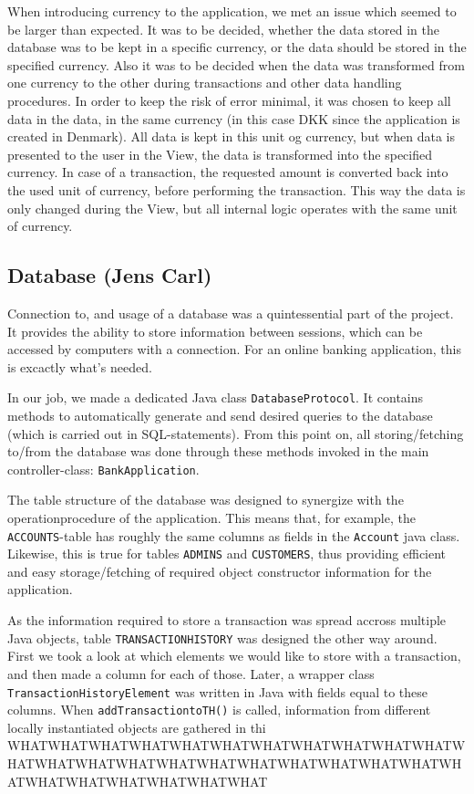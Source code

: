 When introducing currency to the application, we met an issue which seemed to be larger than expected. It was to be decided, whether the data stored in the database was to be kept in a specific currency, or the data should be stored in the specified currency. Also it was to be decided when the data was transformed from one currency to the other during transactions and other data handling procedures. In order to keep the risk of error minimal, it was chosen to keep all data in the data, in the same currency (in this case DKK since the application is created in Denmark). All data is kept in this unit og currency, but when data is presented to the user in the View, the data is transformed into the specified currency. In case of a transaction, the requested amount is converted back into the used unit of currency, before performing the transaction. This way the data is only changed during the View, but all internal logic operates with the same unit of currency.

\subsection{Database (Jens Carl)}
Connection to, and usage of a database was a quintessential part of the project. It provides the ability to store information between sessions, which can be accessed by computers with a connection. For an online banking application, this is excactly what's needed.

In our job, we made a dedicated Java class \texttt{DatabaseProtocol}. It contains methods to automatically generate and send desired queries to the database (which is carried out in SQL-statements). From this point on, all storing/fetching to/from the database was done through these methods invoked in the main controller-class: \texttt{BankApplication}. 

The table structure of the database was designed to synergize with the operationprocedure of the application. This means that, for example, the \texttt{ACCOUNTS}-table has roughly the same columns as fields in the \texttt{Account} java class. Likewise, this is true for tables \texttt{ADMINS} and \texttt{CUSTOMERS}, thus providing efficient and easy storage/fetching of required object constructor information for the application. 

As the information required to store a transaction was spread accross multiple Java objects, table \texttt{TRANSACTIONHISTORY} was designed the other way around. First we took a look at which elements we would like to store with a transaction, and then made a column for each of those. Later, a wrapper class \texttt{TransactionHistoryElement} was written in Java with fields equal to these columns. When \texttt{addTransactiontoTH()} is called, information from different locally instantiated objects are gathered in thi WHATWHATWHATWHATWHATWHATWHATWHATWHATWHATWHATWHATWHATWHATWHATWHATWHATWHATWHATWHATWHATWHATWHATWHATWHATWHATWHATWHATWHAT

